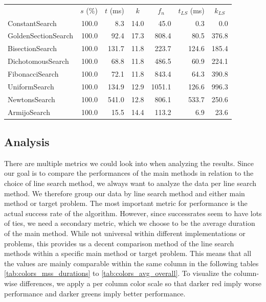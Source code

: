 \documentclass[a4paper,english,titlepage,12pt]{article}
\begin{document}
\begin{center}
\label{tab:performance_results_NE_HBM}
\begin{tabular}{|l|r|r|r|r|r|r|}
\hline
\rowcolor{gray!25}
\multicolumn{1}{|c|}{Line Search Name} & \multicolumn{1}{c|}{$s$ (\%)} & \multicolumn{1}{c|}{$t$ (ms)} & \multicolumn{1}{c|}{$k$} & \multicolumn{1}{c|}{$f_n$} & \multicolumn{1}{c|}{$t_{LS}$ (ms)} & \multicolumn{1}{c|}{$k_{LS}$} \\
ConstantSearch & 100.0 & 8.3 & 14.0 & 45.0 & 0.3 & 0.0 \\
GoldenSectionSearch & 100.0 & 92.4 & 17.3 & 808.4 & 80.5 & 376.8 \\
BisectionSearch & 100.0 & 131.7 & 11.8 & 223.7 & 124.6 & 185.4 \\
DichotomousSearch & 100.0 & 68.8 & 11.8 & 486.5 & 60.9 & 224.1 \\
FibonacciSearch & 100.0 & 72.1 & 11.8 & 843.4 & 64.3 & 390.8 \\
UniformSearch & 100.0 & 134.9 & 12.9 & 1051.1 & 126.6 & 996.3 \\
NewtonsSearch & 100.0 & 541.0 & 12.8 & 806.1 & 533.7 & 250.6 \\
ArmijoSearch & 100.0 & 15.5 & 14.4 & 113.2 & 6.9 & 23.6 \\
\hline
\end{tabular}
\end{center}


\subsection{Analysis}


There are multiple metrics we could look into when analyzing the results. Since our goal is to compare the performances of the main methods in relation to the choice of line search method, we always want to analyze the data per line search method. We therefore group our data by line search method and either main method or target problem. The most important metric for performance is the actual success rate of the algorithm. However, since successrates seem to have lots of ties, we need a secondary metric, which we choose to be the average duration of the main method. While not universal within different implementations or problems, this provides us a decent comparison method of the line search methods within a specific main method or target problem. This means that all the values are mainly comparable within the same column in the following tables \ref{tab:colors_mss_durations} to \ref{tab:colors_avg_overall}. To visualize the column-wise differences, we apply a per column color scale so that darker red imply worse performance and darker greens imply better performance.
\end{document}
